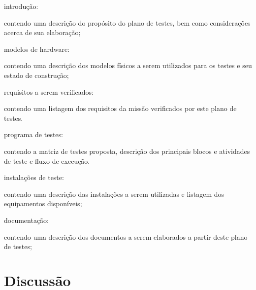 \begin{alineas}
    \item introdução:
    \begin{alineas}
        \item contendo uma descrição do propósito do plano de testes, bem como considerações acerca de sua elaboração;
    \end{alineas}

    \item modelos de hardware:
    \begin{alineas}
        \item contendo uma descrição dos modelos físicos a serem utilizados para os testes e seu estado de construção;
    \end{alineas}

    \item requisitos a serem verificados:
    \begin{alineas}
        \item contendo uma listagem dos requisitos da missão verificados por este plano de testes.
    \end{alineas}

    \item programa de testes:
    \begin{alineas}
        \item contendo a matriz de testes proposta, descrição dos principais blocos e atividades de teste e fluxo de execução.
    \end{alineas}

    \item instalações de teste:
    \begin{alineas}
        \item contendo uma descrição das instalações a serem utilizadas e listagem dos equipamentos disponíveis;
    \end{alineas}

    \item documentação:
    \begin{alineas}
        \item contendo uma descrição dos documentos a serem elaborados a partir deste plano de testes;
    \end{alineas}

\end{alineas}


\section{Discussão}

